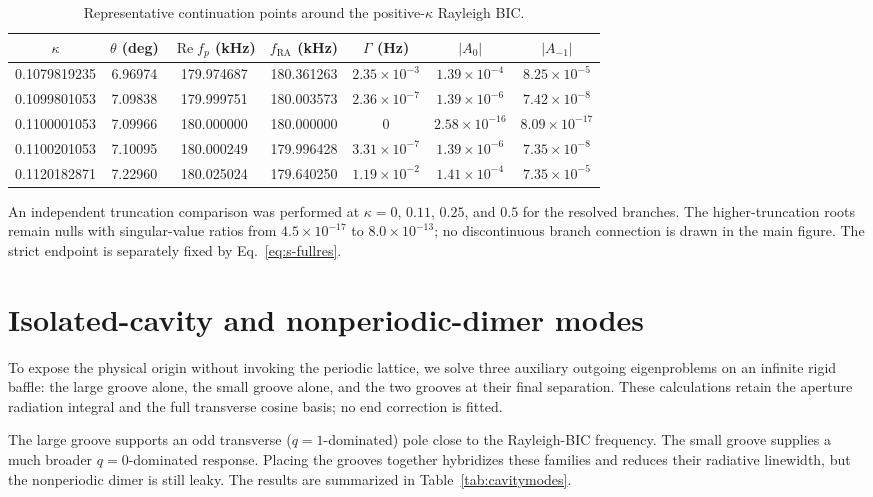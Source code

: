 \documentclass[aps,prl,reprint,superscriptaddress,nofootinbib,floatfix]{revtex4-2}
\begin{document}
\begin{table}[t]
\caption{\label{tab:pole}Representative continuation points around the
positive-$\kappa$ Rayleigh BIC.}
\begin{ruledtabular}
\begin{tabular}{ccccccc}
$\kappa$ & $\theta$ (deg) & $\operatorname{Re}f_p$ (kHz) &
$f_{\mathrm{RA}}$ (kHz) & $\Gamma$ (Hz) & $|A_0|$ & $|A_{-1}|$\\
\hline
0.1079819235 & 6.96974 & 179.974687 & 180.361263 & $2.35\times10^{-3}$ & $1.39\times10^{-4}$ & $8.25\times10^{-5}$\\
0.1099801053 & 7.09838 & 179.999751 & 180.003573 & $2.36\times10^{-7}$ & $1.39\times10^{-6}$ & $7.42\times10^{-8}$\\
0.1100001053 & 7.09966 & 180.000000 & 180.000000 & 0 & $2.58\times10^{-16}$ & $8.09\times10^{-17}$\\
0.1100201053 & 7.10095 & 180.000249 & 179.996428 & $3.31\times10^{-7}$ & $1.39\times10^{-6}$ & $7.35\times10^{-8}$\\
0.1120182871 & 7.22960 & 180.025024 & 179.640250 & $1.19\times10^{-2}$ & $1.41\times10^{-4}$ & $7.35\times10^{-5}$\\
\end{tabular}
\end{ruledtabular}
\end{table}

An independent truncation comparison was performed at $\kappa=0$, $0.11$,
$0.25$, and $0.5$ for the resolved branches.  The higher-truncation roots
remain nulls with singular-value ratios from $4.5\times10^{-17}$ to
$8.0\times10^{-13}$; no discontinuous branch connection is drawn in the
main figure.  The strict endpoint is separately fixed by
Eq.~\eqref{eq:s-fullres}.

\section{Isolated-cavity and nonperiodic-dimer modes}

To expose the physical origin without invoking the periodic lattice, we solve
three auxiliary outgoing eigenproblems on an infinite rigid baffle: the large
groove alone, the small groove alone, and the two grooves at their final
separation.  These calculations retain the aperture radiation integral and
the full transverse cosine basis; no end correction is fitted.

The large groove supports an odd transverse ($q=1$-dominated) pole close to
the Rayleigh-BIC frequency.  The small groove supplies a much broader
$q=0$-dominated response.  Placing the grooves together hybridizes these
families and reduces their radiative linewidth, but the nonperiodic dimer is
still leaky.  The results are summarized in Table~\ref{tab:cavitymodes}.
\end{document}
